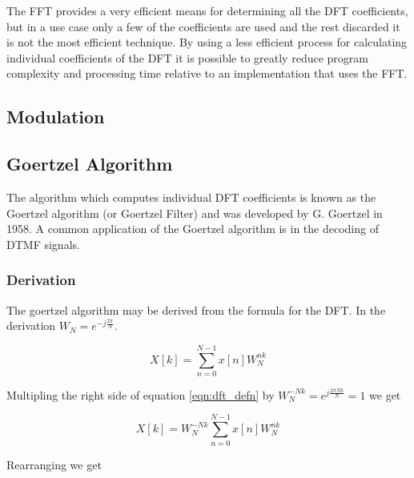 The FFT provides a very efficient means for determining all the DFT coefficients, but in a use case only a few of the coefficients are used and the rest discarded it is not the most efficient technique. By using a less efficient process for calculating individual coefficients of the DFT it is possible to greatly reduce program complexity and processing time relative to an implementation that uses the FFT.


\subsection{Modulation}

\subsection{Goertzel Algorithm}

The algorithm which computes individual DFT coefficients is known as the Goertzel algorithm (or Goertzel Filter) and was developed by G. Goertzel in 1958. \cite{Goertzel1958} A common application of the Goertzel algorithm is in the decoding of DTMF\footnotemark{} signals.

\subsubsection{Derivation}
The goertzel algorithm may be derived from the formula for the DFT. In the derivation \(W_N = e^{-j\frac{2\pi}{N}}\).

\begin{equation}
	\label{eqn:dft_defn}
	X[k] = \sum_{n=0}^{N-1}x[n]W_{N}^{nk}
\end{equation}

Multipling the right side of equation \ref{eqn:dft_defn} by \(W_{N}^{-Nk} = e^{j\frac{2\pi N k}{N}} = 1\) we get

\begin{equation}
X[k] = W_{N}^{-Nk}\sum_{n=0}^{N-1}x[n]W_{N}^{nk}
\end{equation}

Rearranging we get

